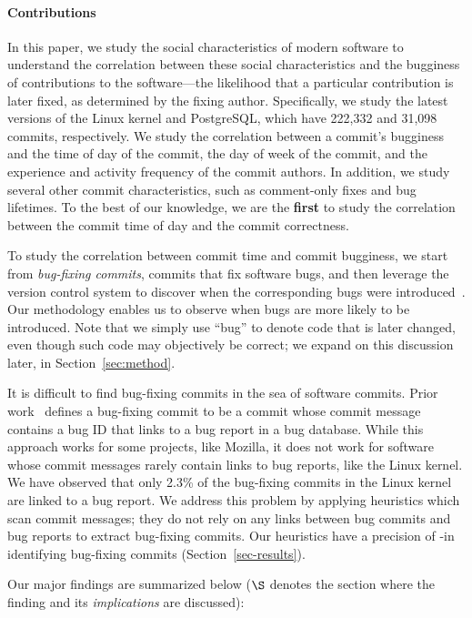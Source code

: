 \paragraph{Contributions}

In this paper, we study the social characteristics of modern software to
understand the correlation between these social characteristics and the
bugginess of contributions to the software---the likelihood that a particular
contribution is later fixed, as determined by the fixing author.  Specifically,
we study the latest versions of the Linux kernel and PostgreSQL, which have
222,332 and 31,098 commits, respectively.  We study the correlation between a
commit's bugginess and the time of day of the commit, the day of week of the
commit, and the experience and activity frequency of the commit authors.  In
addition, we study several other commit characteristics, such as comment-only
fixes and bug lifetimes.  To the best of our knowledge, we are the {\bf first}
to study the correlation between the commit time of day and the commit
correctness.

To study the correlation between commit time and commit bugginess, we start from
{\em bug-fixing commits}, commits that fix software bugs, and then leverage the
version control system to discover when the corresponding bugs were
introduced~\cite{sliwerski-msr-2005}.  Our methodology enables us to observe
when bugs are more likely to be introduced.  Note that we simply use ``bug'' to
denote code that is later changed, even though such code may objectively be
correct; we expand on this discussion later, in Section~\ref{sec:method}.

It is difficult to find bug-fixing commits in the sea of software commits.
Prior work~\cite{sliwerski-msr-2005} defines a bug-fixing commit to be a commit
whose commit message contains a bug ID that links to a bug report in a bug
database. While this approach works for some projects, like Mozilla, it does not
work for software whose commit messages rarely contain links to bug reports,
like the Linux kernel.  We have observed that only 2.3\% of the bug-fixing
commits in the Linux kernel are linked to a bug report.  We address this problem
by applying heuristics which scan commit messages; they do not rely on any links
between bug commits and bug reports to extract bug-fixing commits.  Our
heuristics have a precision of \postP-\linuxP in identifying bug-fixing commits
(Section~\ref{sec-results}).

Our major findings are summarized below ($\S$ denotes the section where the
finding and its {\em implications} are discussed):

